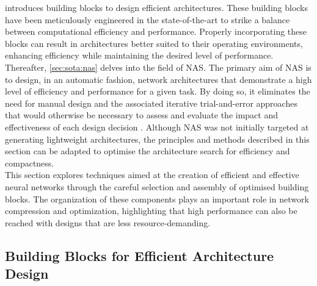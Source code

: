  introduces building blocks to design efficient
architectures. These building blocks have been meticulously engineered in the
state-of-the-art to strike a balance between computational efficiency and
performance. Properly incorporating these blocks can result in architectures
better suited to their operating environments, enhancing efficiency while
maintaining the desired level of performance.\\

Thereafter, \cref{sec:sota:nas} delves into the field of \acl{NAS}. The primary
aim of \ac{NAS} is to design, in an automatic fashion, network architectures
that demonstrate a high level of efficiency and performance for a given task. By
doing so, it eliminates the need for manual design and the associated iterative
trial-and-error approaches that would otherwise be necessary to assess and
evaluate the impact and effectiveness of each design decision
\cite{DBLP:journals/corr/HowardZCKWWAA17,DBLP:conf/cvpr/SandlerHZZC18,DBLP:conf/iccv/HowardPALSCWCTC19}.
Although \ac{NAS} was not initially targeted at generating lightweight
architectures, the principles and methods described in this section can be
adapted to optimise the architecture search for efficiency and compactness. \\

This section explores techniques aimed at the creation of efficient and
effective neural networks through the careful selection and assembly of
optimised building blocks. The organization of these components plays an
important role in network compression and optimization, highlighting that high
performance can also be reached with designs that are less resource-demanding.\\

\subsection{Building Blocks for Efficient Architecture Design}\label{sec:sota:efficient_archi}


